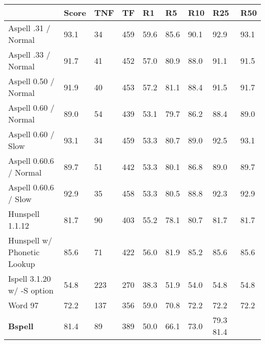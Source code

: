 \documentclass[UTF8,a4paper]{ctexart}
\begin{document}
\begin{table}
\centering
    \begin{tabular}{|l|l|l|l|l|l|l|l|l|}
    \hline
		~				& Score & TNF	& TF	&R1	&R5 	&R10 &R25 &R50 \\
		\hline
		Aspell .31 / Normal     	&93.1	&34			&459		&59.6	&85.6	&90.1	&92.9	&93.1 \\
		\hline
		Aspell .33 / Normal		&91.7	&41			&452		&57.0	&80.9	&88.0	&91.1	&91.5 \\
		\hline
		Aspell 0.50 / Normal		&91.9	&40			&453		&57.2	&81.1	&88.4	&91.5	&91.7 \\
		\hline
		Aspell 0.60 / Normal		&89.0	&54			&439		&53.1	&79.7	&86.2	&88.4	&89.0 \\
		\hline
		Aspell 0.60 / Slow		&93.1	&34			&459		&53.3	&80.7	&89.0	&92.5	&93.1 \\
		\hline
		Aspell 0.60.6 / Normal		&89.7	&51			&442		&53.3	&80.1	&86.8	&89.0	&89.7 \\
		\hline
		Aspell 0.60.6 / Slow		&92.9	&35			&458		&53.3	&80.5	&88.8	&92.3	&92.9 \\
		\hline
		Hunspell 1.1.12			&81.7	&90			&403		&55.2	&78.1	&80.7	&81.7	&81.7 \\
		\hline
		Hunspell w/ Phonetic Lookup	&85.6	&71			&422		&56.0	&81.9	&85.2	&85.6	&85.6 \\
		\hline
		Ispell 3.1.20 w/ -S option	&54.8	&223			&270		&38.3	&51.9	&54.0	&54.8	&54.8 \\
		\hline
		Word 97				&72.2	&137			&356		&59.0	&70.8	&72.2	&72.2	&72.2 \\
		\hline
		\textbf{Bspell}	&	81.4 & 89 & 389 & 50.0 & 66.1 & 73.0 & 79.3 81.4 \\
		\hline
    \end{tabular}
\end{table}

\clearpage


\end{document}
